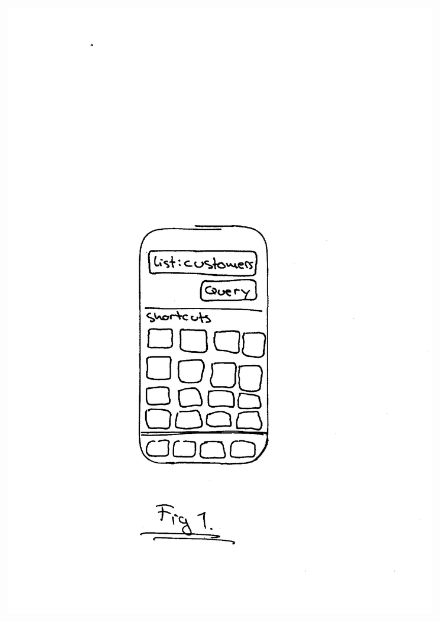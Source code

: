 \documentclass[envcountsame]{llncs}
\begin{document}
\begin{figure}[bth]
{    {\includegraphics[scale=0.80]{gfx/mainscreen}}} \quad
\end{figure}
\end{document}
